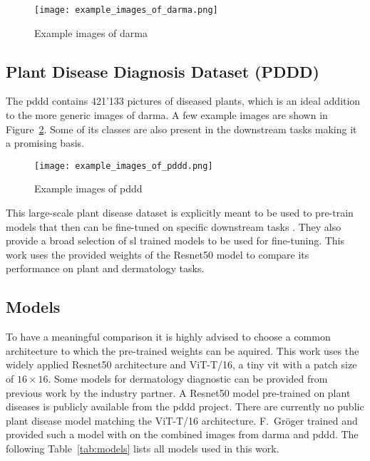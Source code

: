 \begin{figure}[H]
    \begin{center}
    \texttt{[image: example\_images\_of\_darma.png]}
    \caption{Example images of \gls{darma}}\label{fig:example_images_of_darma}
    \end{center}
\end{figure}

\subsection{Plant Disease Diagnosis Dataset (PDDD)}
The \gls{pddd} contains 421'133 pictures of diseased plants, which is an ideal addition to the more generic images of \gls{darma}.
A few example images are shown in Figure~\ref{fig:example_images_of_pddd}. 
Some of its classes are also present in the downstream tasks making it a promising basis.
\begin{figure}[H]
    \begin{center}
    \texttt{[image: example\_images\_of\_pddd.png]}
    \caption{Example images of \gls{pddd}}\label{fig:example_images_of_pddd}
    \end{center}
\end{figure}

This large-scale plant disease dataset is explicitly meant to be used to pre-train models that then can be fine-tuned on specific downstream tasks \autocite{dong2023}. 
They also provide a broad selection of \gls{sl} trained models to be used for fine-tuning. 
This work uses the provided weights of the Resnet50 model to compare its performance on plant and dermatology tasks.

\subsection{Models}
To have a meaningful comparison it is highly advised to choose a common architecture to which the pre-trained weights can be aquired.
This work uses the widely applied Resnet50 architecture and ViT-T/16, a tiny \gls{vit} with a patch size of $16 \times 16$.
Some models for dermatology diagnostic can be provided from previous work by the industry partner.
A Resnet50 model pre-trained on plant diseases is publicly available from the \gls{pddd} project.
There are currently no public plant disease model matching the ViT-T/16 architecture.
F.~Gröger trained and provided such a model with on the combined images from \gls{darma} and \gls{pddd}.
The following Table~\ref{tab:models} lists all models used in this work.

